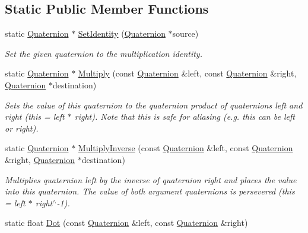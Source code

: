 \subsection*{Static Public Member Functions}
\begin{DoxyCompactItemize}
\item 
static \hyperlink{class_flounder_1_1_quaternion}{Quaternion} $\ast$ \hyperlink{class_flounder_1_1_quaternion_a2c7a3b1c9f4bf6509401e40d8eab298d}{Set\+Identity} (\hyperlink{class_flounder_1_1_quaternion}{Quaternion} $\ast$source)
\begin{DoxyCompactList}\small\item\em Set the given quaternion to the multiplication identity. \end{DoxyCompactList}\item 
static \hyperlink{class_flounder_1_1_quaternion}{Quaternion} $\ast$ \hyperlink{class_flounder_1_1_quaternion_a0db2c45da20eb71c119d8afbbcbe57b8}{Multiply} (const \hyperlink{class_flounder_1_1_quaternion}{Quaternion} \&left, const \hyperlink{class_flounder_1_1_quaternion}{Quaternion} \&right, \hyperlink{class_flounder_1_1_quaternion}{Quaternion} $\ast$destination)
\begin{DoxyCompactList}\small\item\em Sets the value of this quaternion to the quaternion product of quaternions left and right (this = left $\ast$ right). Note that this is safe for aliasing (e.\+g. this can be left or right). \end{DoxyCompactList}\item 
static \hyperlink{class_flounder_1_1_quaternion}{Quaternion} $\ast$ \hyperlink{class_flounder_1_1_quaternion_ae8d1168280d4eec0ada34edea07bba3c}{Multiply\+Inverse} (const \hyperlink{class_flounder_1_1_quaternion}{Quaternion} \&left, const \hyperlink{class_flounder_1_1_quaternion}{Quaternion} \&right, \hyperlink{class_flounder_1_1_quaternion}{Quaternion} $\ast$destination)
\begin{DoxyCompactList}\small\item\em Multiplies quaternion left by the inverse of quaternion right and places the value into this quaternion. The value of both argument quaternions is persevered (this = left $\ast$ right$^\wedge$-\/1). \end{DoxyCompactList}\item 
static float \hyperlink{class_flounder_1_1_quaternion_a46e14d08030eabba2efd7ff6360c8db7}{Dot} (const \hyperlink{class_flounder_1_1_quaternion}{Quaternion} \&left, const \hyperlink{class_flounder_1_1_quaternion}{Quaternion} \&right)

\end{DoxyCompactItemize}
